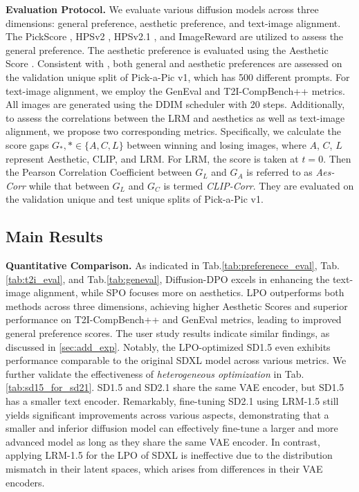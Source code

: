 \textbf{Evaluation Protocol.} We evaluate various diffusion models across three dimensions: general preference, aesthetic preference, and text-image alignment. The PickScore \cite{pickscore}, HPSv2 \cite{hpsv2}, HPSv2.1 \cite{hpsv2}, and ImageReward \cite{imagereward} are utilized to assess the general preference. The aesthetic preference is evaluated using the Aesthetic Score \cite{aesthetic}. Consistent with \cite{spo}, both general and aesthetic preferences are assessed on the validation unique split of Pick-a-Pic v1, which has 500 different prompts. For text-image alignment, we employ the GenEval \cite{geneval} and T2I-CompBench++ \cite{t2i_compbench} metrics. All images are generated using the DDIM scheduler with 20 steps. Additionally, to assess the correlations between the LRM and aesthetics as well as text-image alignment, we propose two corresponding metrics. Specifically, we calculate the score gaps $G_*,*\in\{A,C,L\}$ between winning and losing images, where $A$, $C$, $L$ represent Aesthetic, CLIP, and LRM. For LRM, the score is taken at $t=0$. Then the Pearson Correlation Coefficient \cite{pearson} between $G_L$ and $G_A$ is referred to as \textit{Aes-Corr} while that between $G_L$ and $G_C$ is termed \textit{CLIP-Corr}. They are evaluated on the validation unique and test unique splits of Pick-a-Pic v1.

\subsection{Main Results}


\textbf{Quantitative Comparison.} As indicated in Tab.\;\ref{tab:preferenece_eval}, Tab.\;\ref{tab:t2i_eval}, and Tab.\;\ref{tab:geneval}, Diffusion-DPO excels in enhancing the text-image alignment, while SPO focuses more on aesthetics. LPO outperforms both methods across three dimensions, achieving higher Aesthetic Scores and superior performance on T2I-CompBench++ and GenEval metrics, leading to improved general preference scores. The user study results indicate similar findings, as discussed in \cref{sec:add_exp}. Notably, the LPO-optimized SD1.5 even exhibits performance comparable to the original SDXL model across various metrics.  We further validate the effectiveness of \textit{heterogeneous optimization} in Tab.\;\ref{tab:sd15_for_sd21}. SD1.5 and SD2.1 \cite{sd1} share the same VAE encoder, but SD1.5 has a smaller text encoder. Remarkably, fine-tuning SD2.1 using LRM-1.5 still yields significant improvements across various aspects, demonstrating that a smaller and inferior diffusion model can effectively fine-tune a larger and more advanced model as long as they share the same VAE encoder. In contrast, applying LRM-1.5 for the LPO of SDXL is ineffective due to the distribution mismatch in their latent spaces, which arises from differences in their VAE encoders.


